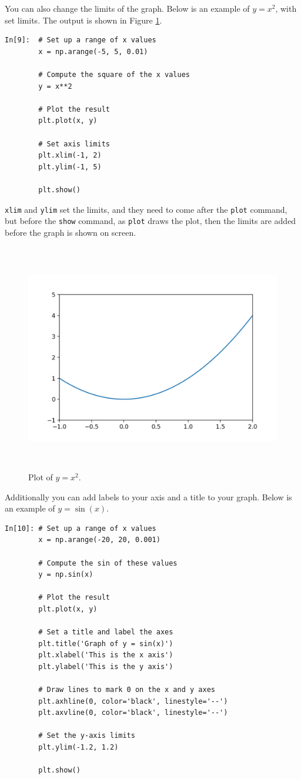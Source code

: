 You can also change the limits of the graph. Below is an example of $y=x^{2}$, with set limits. The output is shown in Figure \ref{fig:pyx2}.
\begin{lstlisting}[style=PY]
In[9]:  # Set up a range of x values
        x = np.arange(-5, 5, 0.01)
        
        # Compute the square of the x values
        y = x**2
        
        # Plot the result
        plt.plot(x, y)

        # Set axis limits
        plt.xlim(-1, 2)
        plt.ylim(-1, 5)

        plt.show()
\end{lstlisting}

\texttt{xlim} and \texttt{ylim} set the limits, and they need to come after the \texttt{plot} command, but before the \texttt{show} command, as \texttt{plot} draws the plot, then the limits are added before the graph is shown on screen.

\begin{figure}[H]
	\centering
	\includegraphics[height=10cm]{Figures/plotyx2.png}
\caption{Plot of $y=x^{2}$.}
\label{fig:pyx2}
\end{figure}

Additionally you can add labels to your axis and a title to your graph. Below is an example of $y=\sin(x)$.
\begin{lstlisting}[style=PY]
In[10]: # Set up a range of x values
        x = np.arange(-20, 20, 0.001)
        
        # Compute the sin of these values
        y = np.sin(x)
        
        # Plot the result
        plt.plot(x, y)

        # Set a title and label the axes
        plt.title('Graph of y = sin(x)')
        plt.xlabel('This is the x axis')
        plt.ylabel('This is the y axis')

        # Draw lines to mark 0 on the x and y axes
        plt.axhline(0, color='black', linestyle='--')
        plt.axvline(0, color='black', linestyle='--')

        # Set the y-axis limits
        plt.ylim(-1.2, 1.2)

        plt.show()
\end{lstlisting}

